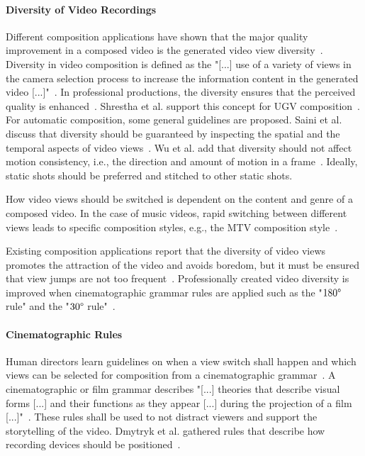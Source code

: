 \paragraph{Diversity of Video Recordings}
Different composition applications have shown that the major quality improvement in a composed video is the generated video view diversity~\cite{Arev2014,Saini2012,Shrestha2010,Wu2015}.
Diversity in video composition is defined as the "[...] use of a variety of views in the camera selection process to increase the information content in the generated video [...]"~\cite[7199]{Bano2015b}.
In professional productions, the diversity ensures that the perceived quality is enhanced~\cite{Bowen2013b,Zettl2016}.
Shrestha et al. support this concept for \ac{UGV} composition~\cite{Shrestha2010}.
For automatic composition, some general guidelines are proposed.
Saini et al. discuss that diversity should be guaranteed by inspecting the spatial and the temporal aspects of video views~\cite{Saini2012}.
Wu et al. add that diversity should not affect motion consistency, i.e., the direction and amount of motion in a frame~\cite{Wu2015}.
Ideally, static shots should be preferred and stitched to other static shots.

How video views should be switched is dependent on the content and genre of a composed video.
In the case of music videos, rapid switching between different views leads to specific composition styles, e.g., the \ac{MTV} composition style~\cite{Ward2003}.

Existing composition applications report that the diversity of video views promotes the attraction of the video and avoids boredom, but it must be ensured that view jumps are not too frequent~\cite{Arev2014}.
Professionally created video diversity is improved when cinematographic grammar rules are applied such as the "$180\degree$ rule" and the "$30\degree$ rule"~\cite{Arev2014,Wu2015}.
\paragraph{Cinematographic Rules}
Human directors learn guidelines on when a view switch shall happen and which views can be selected for composition from a cinematographic grammar~\cite{Dmytryk1984}.
A cinematographic or film grammar describes "[...] theories that describe visual forms [...] and their functions as they appear [...] during the projection of a film [...]"~\cite[96]{Manchel1990}. 
These rules shall be used to not distract viewers and support the storytelling of the video.
Dmytryk et al. gathered rules that describe how recording devices should be positioned~\cite{Dmytryk1984}.

